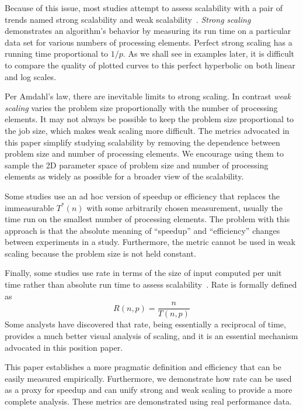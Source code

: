 \documentclass{llncs}
\newcommand*{\lcite}[1]{~\cite{#1}}
\newcommand*{\keyterm}[1]{\emph{#1}}
\begin{document}
Because of this issue, most studies attempt to assess scalability with a
pair of trends named strong scalability and weak
scalability\lcite{Kaminsky2015}. \keyterm{Strong scaling} demonstrates an
algorithm's behavior by measuring its run time on a particular data set for
various numbers of processing elements. Perfect strong scaling has a
running time proportional to $1/p$. As we shall see in examples later, it
is difficult to compare the quality of plotted curves to this perfect
hyperbolic on both linear and log scales.

Per Amdahl's law, there are inevitable limits to strong scaling. In
contrast \keyterm{weak scaling} varies the problem size proportionally with
the number of processing elements. It may not always be possible to keep
the problem size proportional to the job size, which makes weak scaling more
difficult. The metrics advocated in this paper simplify studying
scalability by removing the dependence between problem size and number of
processing elements. We encourage using them to sample the 2D parameter
space of problem size and number of processing elements as widely as
possible for a broader view of the scalability.

Some studies use an ad hoc version of speedup or efficiency that replaces the
immeasurable $T^*(n)$ with some arbitrarily chosen measurement, usually the
time run on the smallest number of processing elements. The problem with
this approach is that the absolute meaning of ``speedup'' and
``efficiency'' changes between experiments in a study. Furthermore, the
metric cannot be used in weak scaling because the problem size is not held
constant.

Finally, some studies use rate in terms of the size of input computed per
unit time rather than absolute run time to assess
scalability\lcite{Kaminsky2015}. Rate is formally defined as
\begin{equation}
  R(n,p) = \frac{n}{T(n,p)}
  \label{eq:Rate}
\end{equation}
Some analysts have discovered that rate, being essentially a reciprocal of
time, provides a much better visual analysis of scaling, and it is
an essential mechanism advocated in this position paper.

This paper establishes a more pragmatic definition and efficiency that can
be easily measured empirically. Furthermore, we demonstrate how rate can be
used as a proxy for speedup and can unify strong and weak scaling to
provide a more complete analysis. These metrics are demonstrated using real
performance data.
\end{document}
